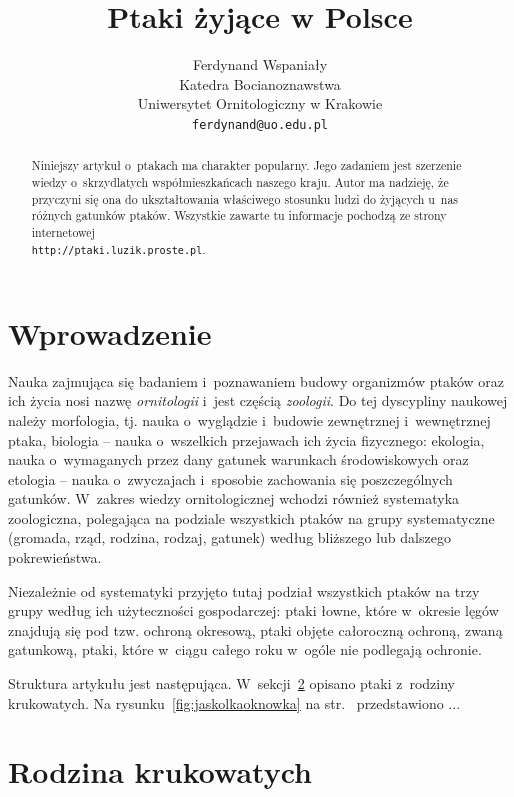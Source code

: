 \documentclass{fundam}
\title{Ptaki żyjące w Polsce}
\author{Ferdynand Wspaniały\\
\small Katedra Bocianoznawstwa\\
\small Uniwersytet Ornitologiczny w Krakowie\\
\small \texttt{ferdynand@uo.edu.pl}\\
}
\date{} %
\begin{document}
\maketitle

\tableofcontents

\listoffigures


\begin{abstract}
Niniejszy artykuł o~ptakach ma charakter popularny. Jego zadaniem jest szerzenie wiedzy o~skrzydlatych współmieszkańcach naszego kraju. Autor ma nadzieję, że przyczyni się ona do ukształtowania właściwego stosunku ludzi do żyjących u~nas różnych gatunków ptaków. Wszystkie zawarte tu informacje pochodzą ze strony internetowej\\ \texttt{http://ptaki.luzik.proste.pl}.
\end{abstract}


\section{Wprowadzenie}
\label{sec:wprowadzenie}

Nauka zajmująca się badaniem i~poznawaniem budowy organizmów ptaków oraz ich życia nosi nazwę \emph{ornitologii} i~jest częścią \emph{zoologii}. Do tej dyscypliny naukowej należy morfologia, tj. nauka o~wyglądzie i~budowie zewnętrznej i~wewnętrznej ptaka, biologia -- nauka o~wszelkich przejawach ich życia fizycznego: ekologia, nauka o~wymaganych przez dany gatunek warunkach środowiskowych oraz etologia -- nauka o~zwyczajach i~sposobie zachowania się poszczególnych gatunków. W~zakres wiedzy ornitologicznej wchodzi również systematyka zoologiczna, polegająca na podziale wszystkich ptaków na grupy systematyczne (gromada, rząd, rodzina, rodzaj, gatunek) według bliższego lub dalszego pokrewieństwa. 

Niezależnie od systematyki przyjęto tutaj podział wszystkich ptaków na trzy grupy według ich użyteczności gospodarczej: ptaki łowne, które w~okresie lęgów znajdują się pod tzw. ochroną okresową, ptaki objęte całoroczną ochroną, zwaną gatunkową, ptaki, które w~ciągu całego roku w~ogóle nie podlegają ochronie.

Struktura artykułu jest następująca. W~sekcji~\ref{sec:rodzinakrukowatych} opisano ptaki z~rodziny krukowatych. Na rysunku~\ref{fig:jaskolkaoknowka} na str.~\pageref{fig:jaskolkaoknowka} przedstawiono ...


\section{Rodzina krukowatych}
\label{sec:rodzinakrukowatych}
\end{document}
